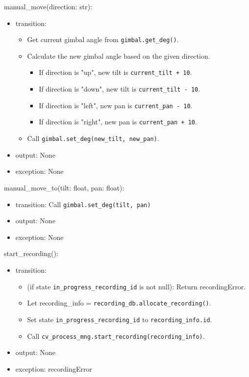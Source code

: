\documentclass[12pt, titlepage]{article}
\begin{document}
\noindent manual\_move(direction: str):
\begin{itemize}
  \item transition:
        \begin{itemize}
          \item Get current gimbal angle from \texttt{gimbal.get\_deg()}.
          \item Calculate the new gimbal angle based on the given direction.
                \begin{itemize}
                  \item If direction is "up", new tilt is \texttt{current\_tilt + 10}.
                  \item If direction is "down", new tilt is \texttt{current\_tilt - 10}.
                  \item If direction is "left", new pan is \texttt{current\_pan - 10}.
                  \item If direction is "right", new pan is \texttt{current\_pan + 10}.
                \end{itemize}
          \item Call \texttt{gimbal.set\_deg(new\_tilt, new\_pan)}.
        \end{itemize}
  \item output: None
  \item exception: None
\end{itemize}

\noindent manual\_move\_to(tilt: float, pan: float):
\begin{itemize}
  \item transition: Call \texttt{gimbal.set\_deg(tilt, pan)}
  \item output: None
  \item exception: None
\end{itemize}

\noindent start\_recording():
\begin{itemize}
  \item transition:
        \begin{itemize}
          \item (if state \texttt{in\_progress\_recording\_id} is not null): Return recordingError.
          \item Let recording\_info = \texttt{recording\_db.allocate\_recording()}.
          \item Set state \texttt{in\_progress\_recording\_id} to \texttt{recording\_info.id}.
          \item Call \texttt{cv\_process\_mng.start\_recording(recording\_info)}.
        \end{itemize}
  \item output: None
  \item exception: recordingError
\end{itemize}
\end{document}
